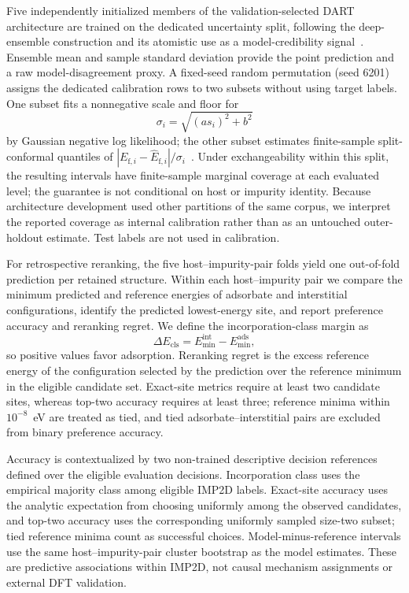 Five independently initialized members of the validation-selected DART
architecture are trained on the dedicated uncertainty split, following the
deep-ensemble construction and its atomistic use as a model-credibility
signal~\cite{lakshminarayanan2017,peterson2017}.  Ensemble mean and sample
standard deviation provide the point prediction and a raw model-disagreement
proxy.  A fixed-seed random permutation (seed 6201) assigns the dedicated
calibration rows to two subsets without using target labels.
One subset fits a nonnegative scale and floor for
\begin{equation}
 \sigma_i=\sqrt{(a s_i)^2+b^2}
\end{equation}
by Gaussian negative log likelihood; the other subset estimates finite-sample
split-conformal quantiles of
$|E_{\mathrm f,i}-\hat E_{\mathrm f,i}|/\sigma_i$~\cite{angelopoulos2023,
hu2022}.
Under exchangeability within this split, the resulting intervals have
finite-sample marginal coverage at each evaluated level; the guarantee is not
conditional on host or impurity identity.  Because architecture development
used other partitions of the same corpus, we interpret the reported coverage
as internal calibration rather than as an untouched outer-holdout estimate.
Test labels are not used in calibration.

For retrospective reranking, the five host--impurity-pair folds yield one
out-of-fold prediction per retained structure.  Within each host--impurity
pair we compare the minimum predicted and reference energies of adsorbate and
interstitial configurations, identify the predicted lowest-energy site, and
report preference accuracy and reranking regret.  We define the
incorporation-class margin as
\begin{equation}
 \Delta E_{\mathrm{cls}}=E_{\min}^{\mathrm{int}}-E_{\min}^{\mathrm{ads}},
 \label{eq:class_margin}
\end{equation}
so positive values favor adsorption.  Reranking regret is the excess reference
energy of the configuration selected by the prediction over the reference
minimum in the eligible candidate set.  Exact-site metrics require at
least two candidate sites, whereas top-two accuracy requires at least three;
reference minima within $10^{-8}$~eV are treated as tied, and tied
adsorbate--interstitial pairs are excluded from binary preference accuracy.

Accuracy is contextualized by two non-trained descriptive decision references
defined over the eligible evaluation decisions.  Incorporation class uses the
empirical majority class among eligible IMP2D labels.  Exact-site accuracy uses
the analytic expectation from choosing uniformly among the observed candidates,
and top-two accuracy uses the corresponding uniformly sampled size-two subset;
tied reference minima count as successful choices.
Model-minus-reference intervals use the same host--impurity-pair cluster
bootstrap as the model estimates.
These are predictive associations within IMP2D, not causal mechanism
assignments or external DFT validation.
